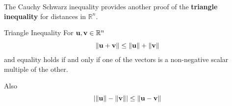 The Cauchy Schwarz inequality provides another proof of the \textbf{triangle
inequality} for
distances in $\mathbb{R}^{n}$.

\begin{theorem}{Triangle Inequality}\label{thm:triangleinequalitydotproduct}
  For $\mathbf{u},\mathbf{v}\in \mathbb{R}^{n}$
\begin{equation}
\| \mathbf{u}+\mathbf{v}\| \leq \| \mathbf{u}\| +\| \mathbf{v}
\|  \label{triangleineq1}
\end{equation}
and equality holds if and only if one of the vectors is a non-negative scalar
multiple of the other. 

Also
\begin{equation}
| \| \mathbf{u}\| -\| \mathbf{v}\| | \leq
\| \mathbf{u}-\mathbf{v}\|  \label{triangleineq2}
\end{equation}
\end{theorem}

